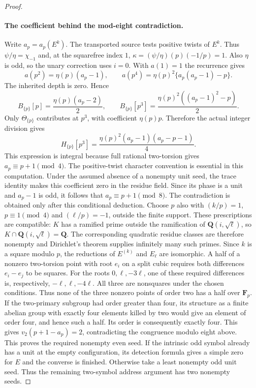 \begin{proof}
\paragraph{The coefficient behind the mod-eight contradiction.}
Write $a_p=a_p(E^k)$. The transported source tests positive twists of $E^k$. Thus
$\psi/\eta=\chi_{-1}$ and, at the squarefree index $1$,
$\kappa=(\psi/\eta)(p)(-1/p)=1$. Also $\eta$ is odd, so
the unary correction uses $i=0$. With $a(1)=1$ the recurrence gives
\[
 a(p^2)=\eta(p)(a_p-1),\qquad
 a(p^4)=\eta(p)^2\{a_p(a_p-1)-p\}.
\]
The inherited depth is zero. Hence
\[
 B_{\{p\}}[p]=\frac{\eta(p)(a_p-2)}2,\qquad
 B_{\{p\}}[p^3]=\frac{\eta(p)^2((a_p-1)^2-p)}2.
\]
Only $\Theta_{\{p\}}$ contributes at $p^3$, with coefficient
$\eta(p)p$. Therefore the actual integer division gives
\[
 H_{\{p\}}[p^3]
   =\frac{\eta(p)^2(a_p-1)(a_p-p-1)}4.
\]
This expression is integral because full rational two-torsion gives
$a_p\equiv p+1\pmod4$. The positive-twist character convention is
essential in this computation. Under the assumed absence of a
nonempty unit seed, the trace identity makes this coefficient zero
in the residue field. Since its phase is a unit and $a_p-1$ is odd,
it follows that $a_p\equiv p+1\pmod8$. The contradiction is obtained
only after this conditional deduction.
Choose $p$ also with $(k/p)=1$, $p\equiv1\pmod4$ and
$(\ell/p)=-1$, outside the finite support.  These prescriptions
are compatible: $K$ has a ramified prime outside the ramification
of $\mathbf Q(i,\sqrt\ell)$, so
$K\cap\mathbf Q(i,\sqrt\ell)=\mathbf Q$.  The corresponding
quadratic residue classes are therefore nonempty and Dirichlet's
theorem supplies infinitely many such primes.  Since $k$ is a
square modulo $p$, the reductions of $E^{(k)}$ and $E_\ell$ are
isomorphic.  A half of a nonzero two-torsion point with root $e_i$
on a split cubic requires both differences $e_i-e_j$ to be
squares.  For the roots $0,\ell,-3\ell$, one of these required
differences is, respectively, $-\ell,\ell,-4\ell$.  All three are
nonsquares under the chosen conditions.  Thus none of the three
nonzero points of order two has a half over $\mathbf F_p$.
If the two-primary subgroup had order greater than four, its
structure as a finite abelian group with exactly four elements
killed by two would give an element of order four, and hence such
a half.  Its order is consequently exactly four.  This gives
$v_2(p+1-a_p)=2$, contradicting the congruence modulo eight above.
This proves the required nonempty even seed. If the intrinsic odd
symbol already has a unit at the empty configuration, its detection
formula gives a simple zero for $E$ and the converse is finished.
Otherwise take a least nonempty odd unit seed. Thus the remaining
two-symbol address argument has two nonempty seeds.
\end{proof}

